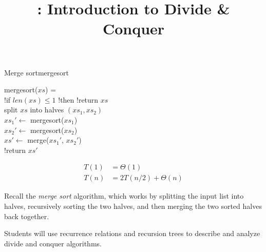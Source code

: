 \documentclass{tufte-handout}
\title{\thecourse: Introduction to Divide \& Conquer}
\date{}
\begin{document}
\maketitle

\begin{model*}{Merge sort}{mergesort}
  \begin{acode}
\> mergesort($xs$) = \\
\> \tb \> !if $\mathit{len}(xs) \leq 1$ !then !return $xs$ \\
\>     \> split $xs$ into halves $(xs_1, xs_2)$ \\
\>     \> $xs_1' \gets$ mergesort($xs_1$) \\
\>     \> $xs_2' \gets$ mergesort($xs_2$) \\
\>     \> $xs' \gets$ merge($xs_1'$, $xs_2'$) \\
\>     \> !return $xs'$
  \end{acode}

  \begin{align*}
    T(1) &= \Theta(1) \\
    T(n) &= 2 T(n/2) + \Theta(n)
  \end{align*}

  \begin{center}
    
  \end{center}
\end{model*}

Recall the \emph{merge sort} algorithm, which works by splitting the
input list into halves, recursively sorting the two halves, and then
merging the two sorted halves back together.

\begin{objective}
  Students will use recurrence relations and recursion trees to
  describe and analyze divide and conquer algorithms.
\end{objective}
\end{document}
